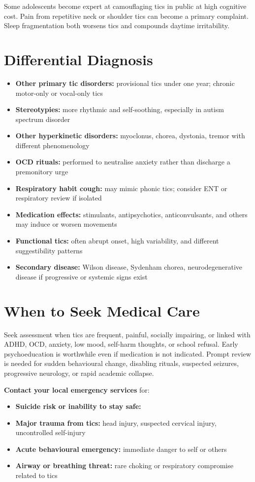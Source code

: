 Some adolescents become expert at camouflaging tics in public at high cognitive cost. Pain from repetitive neck or shoulder tics can become a primary complaint. Sleep fragmentation both worsens tics and compounds daytime irritability.

\section*{Differential Diagnosis}
\begin{itemize}
    \item \textbf{Other primary tic disorders:} provisional tics under one year; chronic motor-only or vocal-only tics
    \item \textbf{Stereotypies:} more rhythmic and self-soothing, especially in autism spectrum disorder
    \item \textbf{Other hyperkinetic disorders:} myoclonus, chorea, dystonia, tremor with different phenomenology
    \item \textbf{OCD rituals:} performed to neutralise anxiety rather than discharge a premonitory urge
    \item \textbf{Respiratory habit cough:} may mimic phonic tics; consider ENT or respiratory review if isolated
    \item \textbf{Medication effects:} stimulants, antipsychotics, anticonvulsants, and others may induce or worsen movements
    \item \textbf{Functional tics:} often abrupt onset, high variability, and different suggestibility patterns
    \item \textbf{Secondary disease:} Wilson disease, Sydenham chorea, neurodegenerative disease if progressive or systemic signs exist
\end{itemize}

\section*{When to Seek Medical Care}
Seek assessment when tics are frequent, painful, socially impairing, or linked with ADHD, OCD, anxiety, low mood, self-harm thoughts, or school refusal. Early psychoeducation is worthwhile even if medication is not indicated. Prompt review is needed for sudden behavioural change, disabling rituals, suspected seizures, progressive neurology, or rapid academic collapse.

\textbf{Contact your local emergency services} for:
\begin{itemize}
    \item \textbf{Suicide risk or inability to stay safe:}
    \item \textbf{Major trauma from tics:} head injury, suspected cervical injury, uncontrolled self-injury
    \item \textbf{Acute behavioural emergency:} immediate danger to self or others
    \item \textbf{Airway or breathing threat:} rare choking or respiratory compromise related to tics
\end{itemize}

